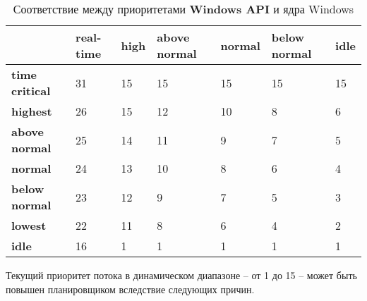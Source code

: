 \begin{table}[h]
	\caption{Соответствие между приоритетами \textbf{Windows API} и ядра Windows}
	\begin{center}
		\begin{tabular}{|l|p{45pt}|p{45pt}|p{45pt}|p{45pt}|p{45pt}|p{45pt}|}
			\hline
			{} & \textbf{real-time} & \textbf{high} & \textbf{above normal} & \textbf{normal} & \textbf{below normal} & \textbf{idle}\\
			\hline
			\textbf{time critical} & 31 & 15 & 15 & 15 & 15 & 15 \\
			\hline
			\textbf{highest} & 26 & 15 & 12 & 10 & 8 & 6 \\
			\hline
			\textbf{above normal} & 25 & 14 & 11 & 9 & 7 & 5 \\
			\hline
			\textbf{normal} & 24 & 13 & 10 & 8 & 6 & 4 \\
			\hline
			\textbf{below normal} & 23 & 12 & 9 & 7 & 5 & 3 \\
			\hline
			\textbf{lowest} & 22 & 11 & 8 & 6 & 4 & 2 \\
			\hline
			\textbf{idle} & 16 & 1 & 1 & 1 & 1 & 1 \\
			\hline
		\end{tabular}
	\end{center}
	\label{tbl:priority}
\end{table}
\newpage

Текущий приоритет потока в динамическом диапазоне – от 1 до 15 – может быть повышен планировщиком вследствие следующих причин.

